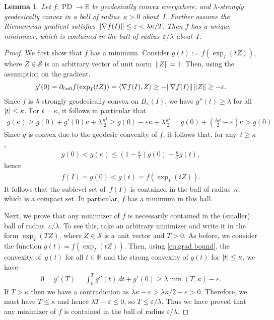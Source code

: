 \documentclass{article}
\newtheorem{lemma}[theorem]{Lemma}
\DeclarePairedDelimiter{\abs}{\lvert}{\rvert}
\DeclarePairedDelimiter{\norm}{\lVert}{\rVert}
\newcommand{\R}{{\mathbb{R}}}
\newcommand\eps{\varepsilon}
\newcommand\PD{\operatorname{PD}}
\newcommand\Sym{\mathcal{S}}
\begin{document}
\begin{lemma}\label{lem:convex-ball}
Let $f\colon \PD\to \R$ be geodesically convex everywhere, and $\lambda$-strongly geodesically convex in a ball of radius~$\kappa>0$ about~$I$.
Further assume the Riemannian gradient satisfies $\norm{\nabla f(I)} \leq \eps < \lambda \kappa / 2$.
Then $f$ has a unique minimizer, which is contained in the ball of radius~$\eps/\lambda$ about~$I$.
\end{lemma}
\begin{proof}
We first show that $f$ has a minimum.
Consider $g(t) := f(\exp_I(tZ))$, where $Z\in \Sym$ is an arbitrary vector of unit norm~$\norm Z = 1$.
Then, using the assumption on the gradient,
\begin{align}\label{eq:grad bound}
  g'(0)
= \partial_{t=0} f(\exp_{I}(tZ))
= \braket{\nabla f(I), Z}
\geq -\norm{\nabla f(I)} \, \norm Z
\geq -\eps.
\end{align}
Since $f$ is $\lambda$-strongly geodesically convex on $B_\kappa(I)$, we have $g''(t) \geq \lambda$ for all $\abs t\leq\kappa$.
For $t=\kappa$, it follows in particular that
\begin{align*}
  g(\kappa)
\geq g(0) + g'(0) \kappa + \lambda \frac{\kappa^2}2
\geq g(0) - \eps \kappa + \lambda \frac{\kappa^2}2
= g(0) + \left( \frac{\lambda\kappa}2 - \eps \right) \kappa
> g(0)
\end{align*}
Since $g$ is convex due to the geodesic convexity of $f$, it follows that, for any~$t \geq \kappa$,
\begin{align*}
  g(0) < g(\kappa) \leq \left( 1-\frac{\kappa}t \right) g(0) + \frac{\kappa}t g(t),
\end{align*}
hence
\begin{align*}
  f(I) = g(0) < g(t) = f(\exp_{I}(tZ)).
\end{align*}
It follows that the sublevel set of~$f(I)$ is contained in the ball of radius~$\kappa$, which is a compact set.
In particular, $f$ has a minimum in this ball.

Next, we prove that any minimizer of $f$ is necessarily contained in the (smaller) ball of radius~$\eps/\lambda$.
To see this, take an arbitrary minimizer and write it in the form $\exp_I(TZ)$, where $Z\in \Sym$ is a unit vector and $T>0$.
As before, we consider the function $g(t) = f(\exp_I(tZ))$.
Then, using \cref{eq:grad bound}, the convexity of~$g(t)$ for all $t\in\R$ and the strong convexity of $g(t)$ for $\abs t \leq \kappa$, we have
\begin{align*}
  0 = g'(T) = \int_0^T g''(t) \, dt + g'(0) \geq \lambda \min(T, \kappa) - \eps.
\end{align*}
If $T>\kappa$ then we have a contradiction as $\lambda\kappa - \eps > \lambda\kappa/2 - \eps > 0$.
Therefore, we must have $T\leq\kappa$ and hence $\lambda T - \eps \leq 0$, so $T \leq \eps/\lambda$.
Thus we have proved that any minimizer of $f$ is contained in the ball of radius $\eps/\lambda$.


\end{proof}
\end{document}
